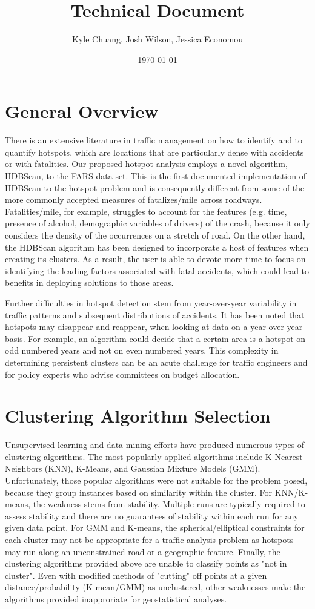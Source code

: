 \documentclass{article}
\begin{document}
\title{Technical Document}
\date{\today}
\author{Kyle Chuang, Josh Wilson, Jessica Economou}

\section{General Overview}

 There is an extensive literature in traffic management on how to identify and to quantify hotspots, which are locations that are particularly dense with accidents or with fatalities. Our proposed hotspot analysis employs a novel algorithm, HDBScan, to the FARS data set. This is the first documented implementation of HDBScan to the hotspot problem and is consequently different from some of the more commonly accepted measures of fatalizes/mile across roadways. Fatalities/mile, for example, struggles to account for the features (e.g. time, presence of alcohol, demographic variables of drivers) of the crash, because it only considers the density of the occurrences on a stretch of road. On the other hand, the HDBScan algorithm has been designed to incorporate a host of features when creating its clusters. As a result, the user is able to devote more time to focus on identifying the leading factors associated with fatal accidents, which could lead to benefits in deploying solutions to those areas.

Further difficulties in hotspot detection stem from year-over-year variability in traffic patterns and subsequent distributions of accidents. It has been noted that hotspots may disappear and reappear, when looking at data on a year over year basis. For example, an algorithm could decide that a certain area is a hotspot on odd numbered years and not on even numbered years. This complexity in determining persistent clusters can be an acute challenge for traffic engineers and for policy experts who advise committees on budget allocation.

\section{Clustering Algorithm Selection}
Unsupervised learning and data mining efforts have produced numerous types of clustering algorithms. The most popularly applied algorithms include K-Nearest Neighbors (KNN), K-Means, and Gaussian Mixture Models (GMM). Unfortunately, those popular algorithms were not suitable for the problem posed, because they group instances based on similarity within the cluster. For KNN/K-means, the weakness stems from stability. Multiple runs are typically required to assess stability and there are no guarantees of stability within each run for any given data point. For GMM and K-means, the spherical/elliptical constraints for each cluster may not be appropriate for a traffic analysis problem as hotspots may run along an unconstrained road or a geographic feature. Finally, the clustering algorithms provided above are unable to classify points as "not in cluster". Even with modified methods of "cutting" off points at a given distance/probability (K-mean/GMM) as unclustered, other weaknesses make the algorithms provided inapproriate for geostatistical analyses.
\end{document}

